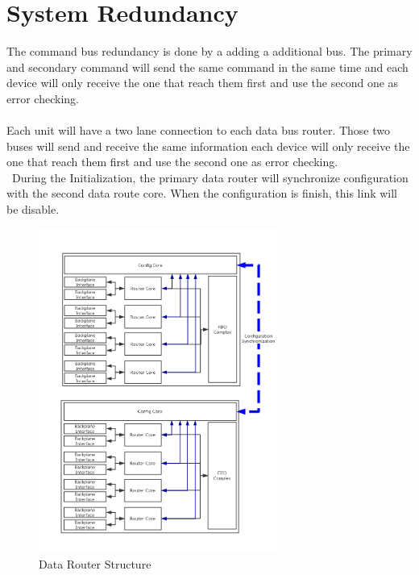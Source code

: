 \documentclass[12pt,article]{memoir}
\begin{document}
\section{System Redundancy}
The command bus redundancy is done by a adding a additional bus. The primary and secondary command will send the same command in the same time and each device will only receive the one that reach them first and use the second one as error checking.\\\\
Each unit will have a two lane connection to each data bus router. Those two buses will send and receive the same information each device will only receive the one that reach them first and use the second one as error checking.\\\
During the Initialization, the primary data router will synchronize configuration with the second data route core. When the configuration is finish, this link will be disable.
\begin{figure}[htp]
\begin{center}
\includegraphics[width=0.7\textwidth]{DR00001_SpaceWire_2.png}
 \caption{Data Router Structure}
\end{center}
\end{figure}
\clearpage
\end{document}
